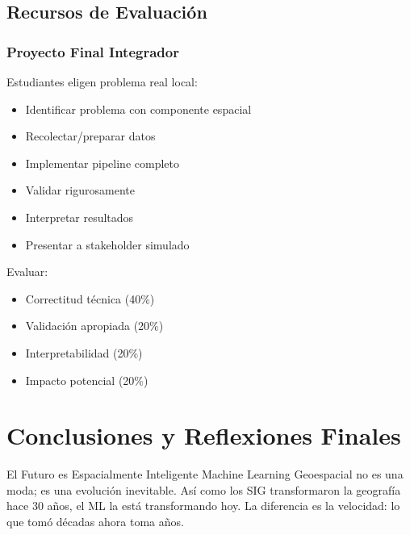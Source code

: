\documentclass[12pt,a4paper]{article}
\begin{document}
\subsection{Recursos de Evaluación}

\subsubsection{Proyecto Final Integrador}

Estudiantes eligen problema real local:
\begin{itemize}
    \item Identificar problema con componente espacial
    \item Recolectar/preparar datos
    \item Implementar pipeline completo
    \item Validar rigurosamente
    \item Interpretar resultados
    \item Presentar a stakeholder simulado
\end{itemize}

Evaluar:
\begin{itemize}
    \item Correctitud técnica (40\%)
    \item Validación apropiada (20\%)
    \item Interpretabilidad (20\%)
    \item Impacto potencial (20\%)
\end{itemize}

\section{Conclusiones y Reflexiones Finales}

\begin{conceptbox}{El Futuro es Espacialmente Inteligente}
Machine Learning Geoespacial no es una moda; es una evolución inevitable. Así como los SIG transformaron la geografía hace 30 años, el ML la está transformando hoy. La diferencia es la velocidad: lo que tomó décadas ahora toma años.
\end{conceptbox}
\end{document}
